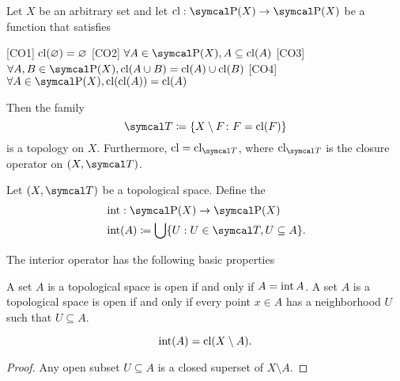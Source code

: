 \begin{proposition}\label{thm:closure_operator_axioms}\cite[14]{Engelking1989}
  Let \( X \) be an arbitrary set and let \( \Cl: \Power(X) \to \Power(X) \) be a function that satisfies
  \begin{description}
    [CO1] \( \operatorname{cl}(\varnothing) = \varnothing \)
    [CO2] \( \forall A \in \Power(X), A \subseteq \Cl(A) \)
    [CO3] \( \forall A, B \in \Power(X), \Cl(A \cup B) = \Cl(A) \cup \Cl(B) \)
    [CO4] \( \forall A \in \Power(X), \Cl(\Cl(A)) = \Cl(A) \)
  \end{description}

  Then the family
  \begin{equation*}
    \Cal{T} \coloneqq \{ X \setminus F \colon F = \Cl(F) \}
  \end{equation*}
  is a topology on \( X \). Furthermore, \( \Cl = \Cl_{\Cal{T}} \), where \( \Cl_{\Cal{T}} \) is the closure operator on \( (X, \Cal{T}) \).
\end{proposition}

\begin{definition}\label{def:interior_operator}\cite[15]{Engelking1989}
  Let \( (X, \Cal{T}) \) be a topological space. Define the 
  \begin{align*}
    &\Int: \Power(X) \to \Power(X) \\
    &\Int(A) \coloneqq \bigcup \{ U : U \in \Cal{T}, U \subseteq A \}.
  \end{align*}
\end{definition}

\begin{proposition}\label{thm:interior_operator_properties}
  The interior operator has the following basic properties
  \begin{thmenum}
     A set \( A \) is a topological space is open if and only if \( A = \operatorname{int} A \).
     A set \( A \) is a topological space is open if and only if every point \( x \in A \) has a neighborhood \( U \) such that \( U \subseteq A \).
  \end{thmenum}
\end{proposition}

\begin{proposition}\label{thm:interior_is_closure_of_complement}
  \begin{equation*}
    \operatorname{int}(A) = \operatorname{cl}(X \setminus A).
  \end{equation*}
\end{proposition}
\begin{proof}
  Any open subset \( U \subseteq A \) is a closed superset of \( X \setminus A \).
\end{proof}

